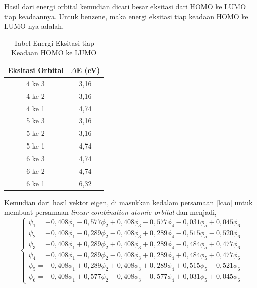 \documentclass[12pt,a4paper]{report}
\begin{document}
Hasil dari energi orbital kemudian dicari besar eksitasi dari HOMO ke LUMO tiap keadaannya. Untuk benzene, maka energi eksitasi tiap keadaan HOMO ke LUMO nya adalah,
\begin{table}[h]
	\centering
	\caption{Tabel Energi Eksitasi tiap Keadaan HOMO ke LUMO}
	\label{delE}
	\begin{tabular}{|c|c|} 
			\hline
			Eksitasi Orbital & $\Delta$E (eV) \\ \hline
			4 ke 3 & 3,16 \\ \hline
			4 ke 2 & 3,16 \\ \hline
			4 ke 1 & 4,74 \\ \hline
			5 ke 3 & 3,16 \\ \hline
			5 ke 2 & 3,16 \\ \hline
			5 ke 1 & 4,74 \\ \hline
			6 ke 3 & 4,74 \\ \hline
			6 ke 2 & 4,74 \\ \hline
			6 ke 1 & 6,32 \\ \hline
	\end{tabular}
\end{table}

Kemudian dari hasil vektor eigen, di masukkan kedalam persamaan \ref{lcao} untuk membuat persamaan \textit{linear combination atomic orbital} dan menjadi,
\begin{equation}
\begin{cases}
{\psi_1} = -0,408{\phi}_{1} - 0,577{\phi}_{2} + 0,408{\phi}_{3} - 0,577{\phi}_{4} - 0,031{\phi}_{5} + 0,045{\phi}_{6}\\
{\psi_2} = -0,408{\phi}_{1} - 0,289{\phi}_{2} - 0,408{\phi}_{3} + 0,289{\phi}_{4} - 0,515{\phi}_{5} - 0,520{\phi}_{6}\\
{\psi_3} = -0,408{\phi}_{1} + 0,289{\phi}_{2} + 0,408{\phi}_{3} + 0,289{\phi}_{4} - 0,484{\phi}_{5} + 0,477{\phi}_{6}\\
{\psi_4} = -0,408{\phi}_{1} - 0,289{\phi}_{2} - 0,408{\phi}_{3} + 0,289{\phi}_{4} + 0,484{\phi}_{5} + 0,477{\phi}_{6}\\
{\psi_5} = -0,408{\phi}_{1} + 0,289{\phi}_{2} + 0,408{\phi}_{3} + 0,289{\phi}_{4} + 0,515{\phi}_{5} - 0,521{\phi}_{6}\\
{\psi_6} = -0,408{\phi}_{1} + 0,577{\phi}_{2} - 0,408{\phi}_{3} - 0,577{\phi}_{4} + 0,031{\phi}_{5} + 0,045{\phi}_{6}
\end{cases}
\end{equation}
\end{document}
